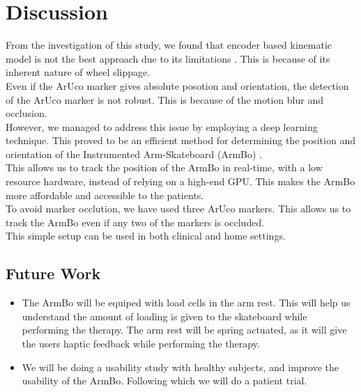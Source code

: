 \documentclass[12pt, twoside]{report}
\begin{document}
\chapter{Discussion}


From the investigation of this study, we found that encoder based kinematic model
is not the best approach due to its limitations \parencite{lynch_modern_2017,li_kinematic_2020,taheri_kinematic_2015}. This is because of its inherent
nature of wheel slippage. \\

Even if the ArUco marker gives absolute posotion and orientation, the detection of the 
ArUco marker is not robust. This is because of the motion blur and occlusion.\\

However, we managed to address this issue by employing a 
deep learning technique. This proved to be an efficient method for 
determining the position and orientation of the Instrumented Arm-Skateboard (ArmBo) \parencite{zhang_deeptag_2021,garrido-jurado_automatic_2014,li_corner_2021}. \\

This allows us to track the position of the ArmBo in real-time, with a low resource 
hardware, instead of relying on a high-end GPU. This makes the ArmBo more affordable
and accessible to the patients. \\

To avoid marker occlution, we have used three ArUco markers. 
This allows us to track the ArmBo even if any two of the markers is occluded. \\

This simple setup can be used in both clinical and home settings.

\section{Future Work}

\begin{itemize}
    \item The ArmBo will be equiped with load cells in the arm rest. This will
    help us understand the amount of loading is given to the skateboard while performing
    the therapy. The arm rest will be spring actuated, as it will give the users
    haptic feedback while performing the therapy.
    \item We will be doing a usability study with healthy subjects, and improve the 
    usability of the ArmBo. Following which we will do a patient trial.
  \end{itemize}
\end{document}
